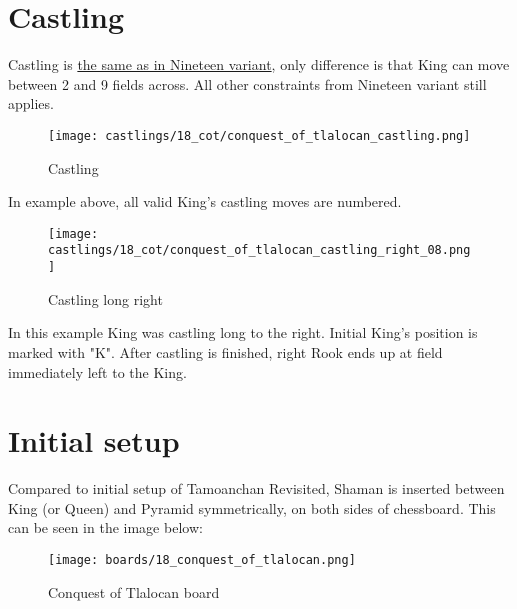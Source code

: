 \clearpage %

\section*{Castling}
\label{sec:Conquest of Tlalocan/Castling}

Castling is
\hyperref[sec:Nineteen/Castling]{the same as in Nineteen variant},
only difference is that King can move
between 2 and 9 fields across. All other constraints from Nineteen variant still
applies.

\noindent
\begin{figure}[!h]
\texttt{[image: castlings/18\_cot/conquest\_of\_tlalocan\_castling.png]}
\caption{Castling}
\label{fig:conquest_of_tlalocan_castling}
\end{figure}

In example above, all valid King's castling moves are numbered.

\noindent
\begin{figure}[!h]
\texttt{[image: castlings/18\_cot/conquest\_of\_tlalocan\_castling\_right\_08.png]}
\caption{Castling long right}
\label{fig:conquest_of_tlalocan_castling_right_08}
\end{figure}

In this example King was castling long to the right. Initial King's position
is marked with "K". After castling is finished, right Rook ends up at field
immediately left to the King.

\clearpage %

\section*{Initial setup}
\label{sec:Conquest of Tlalocan/Initial setup}

Compared to initial setup of Tamoanchan Revisited, Shaman is inserted between
King (or Queen) and Pyramid symmetrically, on both sides of chessboard. This
can be seen in the image below:

\noindent
\begin{figure}[h]
\texttt{[image: boards/18\_conquest\_of\_tlalocan.png]}
\caption{Conquest of Tlalocan board}
\label{fig:18_conquest_of_tlalocan}
\end{figure}

\clearpage %
